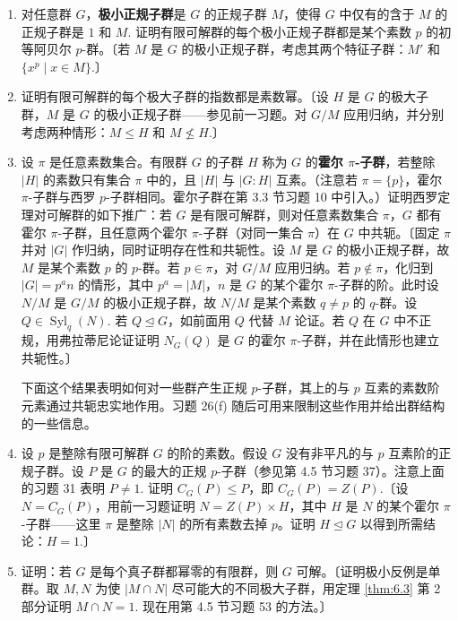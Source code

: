 \begin{enumerate}
\item 对任意群 \(G\)，\textbf{极小正规子群}是 \(G\) 的正规子群 \(M\)，使得 \(G\) 中仅有的含于 \(M\) 的正规子群是 \(1\) 和 \(M\). 证明有限可解群的每个极小正规子群都是某个素数 \(p\) 的初等阿贝尔 \(p\)-群。〔若 \(M\) 是 \(G\) 的极小正规子群，考虑其两个特征子群：\(M'\) 和 \(\{x^p \mid x \in M\}\).〕

\item 证明有限可解群的每个极大子群的指数都是素数幂。〔设 \(H\) 是 \(G\) 的极大子群，\(M\) 是 \(G\) 的极小正规子群——参见前一习题。对 \(G/M\) 应用归纳，并分别考虑两种情形：\(M \leq H\) 和 \(M \not\leq H\).〕

\item 设 \(\pi\) 是任意素数集合。有限群 \(G\) 的子群 \(H\) 称为 \(G\) 的\textbf{霍尔 \(\pi\)-子群}，若整除 \(|H|\) 的素数只有集合 \(\pi\) 中的，且 \(|H|\) 与 \(|G : H|\) 互素。（注意若 \(\pi = \{p\}\)，霍尔 \(\pi\)-子群与西罗 \(p\)-子群相同。霍尔子群在第 3.3 节习题 10 中引入。）证明西罗定理对可解群的如下推广：若 \(G\) 是有限可解群，则对任意素数集合 \(\pi\)，\(G\) 都有霍尔 \(\pi\)-子群，且任意两个霍尔 \(\pi\)-子群（对同一集合 \(\pi\)）在 \(G\) 中共轭。〔固定 \(\pi\) 并对 \(|G|\) 作归纳，同时证明存在性和共轭性。设 \(M\) 是 \(G\) 的极小正规子群，故 \(M\) 是某个素数 \(p\) 的 \(p\)-群。若 \(p \in \pi\)，对 \(G/M\) 应用归纳。若 \(p \notin \pi\)，化归到 \(|G| = p^a n\) 的情形，其中 \(p^a = |M|\)，\(n\) 是 \(G\) 的某个霍尔 \(\pi\)-子群的阶。此时设 \(N/M\) 是 \(G/M\) 的极小正规子群，故 \(N/M\) 是某个素数 \(q \neq p\) 的 \(q\)-群。设 \(Q \in \operatorname{Syl}_q(N)\). 若 \(Q \trianglelefteq G\)，如前面用 \(Q\) 代替 \(M\) 论证。若 \(Q\) 在 \(G\) 中不正规，用弗拉蒂尼论证证明 \(N_G(Q)\) 是 \(G\) 的霍尔 \(\pi\)-子群，并在此情形也建立共轭性。〕

\noindent 下面这个结果表明如何对一些群产生正规 \(p\)-子群，其上的与 \(p\) 互素的素数阶元素通过共轭忠实地作用。习题 26(f) 随后可用来限制这些作用并给出群结构的一些信息。

\item 设 \(p\) 是整除有限可解群 \(G\) 的阶的素数。假设 \(G\) 没有非平凡的与 \(p\) 互素阶的正规子群。设 \(P\) 是 \(G\) 的最大的正规 \(p\)-子群（参见第 4.5 节习题 37）。注意上面的习题 31 表明 \(P \neq 1\). 证明 \(C_G(P) \leq P\)，即 \(C_G(P) = Z(P)\).〔设 \(N = C_G(P)\)，用前一习题证明 \(N = Z(P) \times H\)，其中 \(H\) 是 \(N\) 的某个霍尔 \(\pi\)-子群——这里 \(\pi\) 是整除 \(|N|\) 的所有素数去掉 \(p\)。证明 \(H \trianglelefteq G\) 以得到所需结论：\(H = 1\).〕

\item 证明：若 \(G\) 是每个真子群都幂零的有限群，则 \(G\) 可解。〔证明极小反例是单群。取 \(M, N\) 为使 \(|M \cap N|\) 尽可能大的不同极大子群，用定理 \ref{thm:6.3} 第 2 部分证明 \(M \cap N = 1\). 现在用第 4.5 节习题 53 的方法。〕


\end{enumerate}
